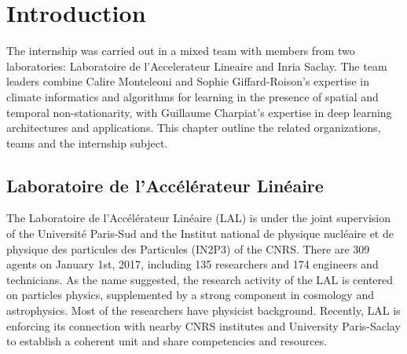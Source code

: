 \chapter{Introduction}
\label{sec:intro}
The internship was carried out in a mixed team with members from two laboratories: Laboratoire de l'Accelerateur Lineaire and Inria Saclay. The team leaders combine Calire Monteleoni and Sophie Giffard-Roison’s expertise in climate informatics and algorithms for learning in the presence of spatial and temporal non-stationarity, with Guillaume Charpiat’s expertise in deep learning architectures and applications. This chapter outline the related organizations, teams and the internship subject.

\section{Laboratoire de l'Accélérateur Linéaire}
\label{sec:laboratory}
The Laboratoire de l'Accélérateur Linéaire (LAL) is under the joint supervision of the Université Paris-Sud and the Institut national de physique nucléaire et de physique des particules  des Particules (IN2P3) of the CNRS. There are 309 agents on January 1st, 2017, including 135 researchers and 174 engineers and technicians. As the name suggested, the research activity of the LAL is centered on particles physics, supplemented by a strong component in cosmology and astrophysics. Most of the researchers have physicist background. Recently, LAL is enforcing its connection with nearby CNRS institutes and University Paris-Saclay to establish a coherent unit and share competencies and resources. 

